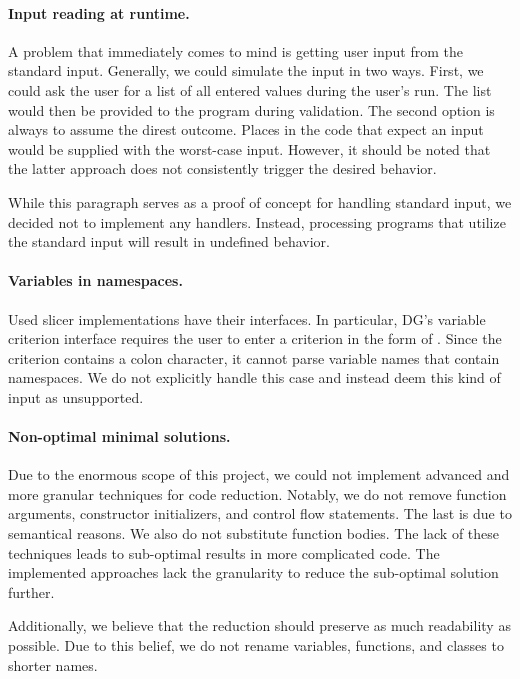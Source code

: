 \paragraph{Input reading at runtime.}
A problem that immediately comes to mind is getting user input from 
the standard input. 
Generally, we could simulate the input in two ways. 
First, we could ask the user for a list of all entered values during 
the user's run. 
The list would then be provided to the program during validation. 
The second option is always to assume the direst outcome. 
Places in the code that expect an input would be supplied with 
the worst-case input. 
However, it should be noted that the latter approach does not consistently 
trigger the desired behavior.

While this paragraph serves as a proof of concept for handling standard 
input, we decided not to implement any handlers. 
Instead, processing programs that utilize the standard input will result in 
undefined behavior.


\paragraph{Variables in namespaces.}
Used slicer implementations have their interfaces. 
In particular, DG's variable criterion interface requires the user to enter 
a criterion in the form of . 
Since the criterion contains a colon character, it cannot parse variable 
names that contain namespaces. 
We do not explicitly handle this case and instead deem this kind of input as 
unsupported.

\paragraph{Non-optimal minimal solutions.}
Due to the enormous scope of this project, we could not implement advanced 
and more granular techniques for code reduction. 
Notably, we do not remove function arguments, constructor initializers, and 
control flow statements. 
The last is due to semantical reasons. 
We also do not substitute function bodies. 
The lack of these techniques leads to sub-optimal results in more 
complicated code. 
The implemented approaches lack the granularity to reduce the sub-optimal 
solution further. 

Additionally, we believe that the reduction should preserve as much 
readability as possible. 
Due to this belief, we do not rename variables, functions, and classes to 
shorter names.

